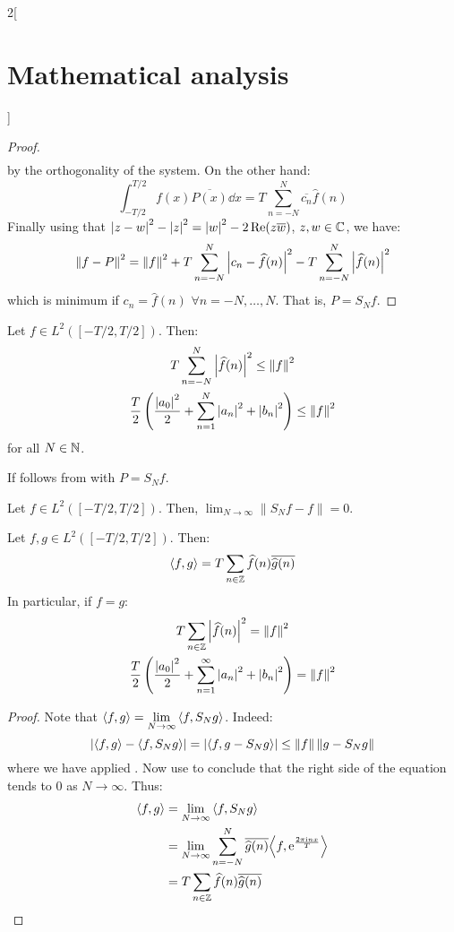 \documentclass[../../../main_math.tex]{subfiles}
\begin{document}
\begin{multicols}{2}[\section{Mathematical analysis}]
\begin{proof}
\begin{align*}
    \end{align*} by the orthogonality of the system.
    On the other hand:
    $$\int_{-T/2}^{T/2}f(x)\overline{P(x)}\dd{x}=T\sum_{n=-N}^N\overline{c_n}\widehat{f}(n)$$
    Finally using that $\abs{z-w}^2 -\abs{z}^2=\abs{w}^2-2\Re(z\overline{w})$, $z,w\in\mathbb{C}$, we have:
    \begin{equation}\label{MA:minimumL2}
      \left\|f-P\right\|^2=\left\|f\right\|^2+T\sum_{n=-N}^{N}\abs{c_n-\widehat{f}(n)}^2-T\sum_{n=-N}^{N}\abs{\widehat{f}(n)}^2
    \end{equation}
    which is minimum if $c_n=\widehat{f}(n)$ $\forall n=-N,\ldots,N$. That is, $P=S_Nf$.
  \end{proof}
  \begin{corollary}\label{MA:bessel}
    Let $f\in L^2([-T/2,T/2])$. Then:
    \begin{gather*}
      T\sum_{n=-N}^N\abs{\widehat{f}(n)}^2\leq{\left\|f\right\|}^2\\
      \frac{T}{2}\left(\frac{\abs{a_0}^2}{2}+\sum_{n=1}^N\abs{a_n}^2+\abs{b_n}^2\right)\leq \left\|f\right\|^2
    \end{gather*} for all $N\in\mathbb{N} $.
  \end{corollary}
  \begin{sproof}
    If follows from  with $P=S_Nf$.
  \end{sproof}
  \begin{corollary}\label{MA:corollaryPolyAprox}
    Let $f\in L^2([-T/2,T/2])$. Then, $\displaystyle\lim_{N\to\infty}\|S_Nf-f\|=0$.
  \end{corollary}
  \begin{theorem}\label{MA:parseval}
    Let $f,g\in L^2([-T/2,T/2])$. Then: $$\langle f,g\rangle=T\sum_{n\in\mathbb{Z} }\widehat{f}(n)\overline{\widehat{g}(n)}$$
    In particular, if $f=g$:
    \begin{gather*}
      T\sum_{n\in\mathbb{Z}}\abs{\widehat{f}(n)}^2={\left\|f\right\|}^2\\
      \frac{T}{2}\left(\frac{\abs{a_0}^2}{2}+\sum_{n=1}^\infty\abs{a_n}^2+\abs{b_n}^2\right)= \left\|f\right\|^2
    \end{gather*}
  \end{theorem}
  \begin{proof}
    Note that $\displaystyle{\left\langle f,g\right\rangle}=\lim_{N\to\infty}{\left\langle f,S_Ng\right\rangle}$. Indeed:
    $$\abs{{\left\langle f,g\right\rangle}-{\left\langle f,S_Ng\right\rangle}}=\abs{{\left\langle f,g-S_Ng\right\rangle}}\leq \left\|f\right\|\left\|g-S_Ng\right\|$$
    where we have applied . Now use  to conclude that the right side of the equation tends to 0 as $N\to\infty$.
    Thus:
    \begin{align*}
      {\left\langle f,g\right\rangle} & =\lim_{N\to\infty}{\left\langle f,S_Ng\right\rangle}                                                              \\
                  & =\lim_{N\to\infty}\sum_{n=-N}^N\overline{\widehat{g}(n)}{\left\langle f,\mathrm{e}^{\frac{2\pi\mathrm{i} n x}{T}}\right\rangle} \\
                  & =T\sum_{n\in\mathbb{Z} }\widehat{f}(n)\overline{\widehat{g}(n)}
    \end{align*}
  \end{proof}

\end{multicols}
\end{document}
